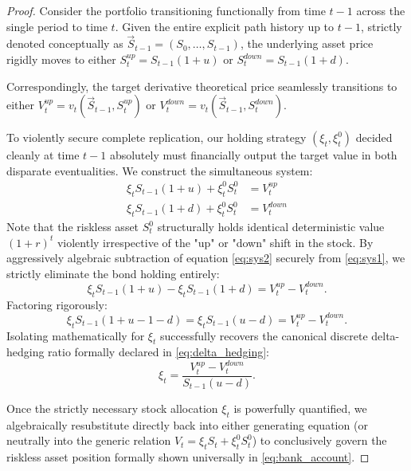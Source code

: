 \begin{proof}
    Consider the portfolio transitioning functionally from time $t-1$ across the single period to time $t$. Given the entire explicit path history up to $t-1$, strictly denoted conceptually as $\vec{S}_{t-1} = (S_0, \dots, S_{t-1})$, the underlying asset price rigidly moves to either $S_t^{up} = S_{t-1}(1+u)$ or $S_t^{down} = S_{t-1}(1+d)$. 
    
    Correspondingly, the target derivative theoretical price seamlessly transitions to either $V_t^{up} = v_t(\vec{S}_{t-1}, S_t^{up})$ or $V_t^{down} = v_t(\vec{S}_{t-1}, S_t^{down})$.
    
    To violently secure complete replication, our holding strategy $(\xi_t, \xi_t^0)$ decided cleanly at time $t-1$ absolutely must financially output the target value in both disparate eventualities. We construct the simultaneous system:
    \begin{align}
        \xi_t S_{t-1}(1+u) + \xi_t^0 S_t^0 &= V_t^{up} \label{eq:sys1} \\
        \xi_t S_{t-1}(1+d) + \xi_t^0 S_t^0 &= V_t^{down} \label{eq:sys2}
    \end{align}
    Note that the riskless asset $S_t^0$ structurally holds identical deterministic value $(1+r)^t$ violently irrespective of the "up" or "down" shift in the stock. By aggressively algebraic subtraction of equation \eqref{eq:sys2} securely from \eqref{eq:sys1}, we strictly eliminate the bond holding entirely:
    \begin{equation}
        \xi_t S_{t-1}(1+u) - \xi_t S_{t-1}(1+d) = V_t^{up} - V_t^{down}.
    \end{equation}
    Factoring rigorously:
    \begin{equation}
        \xi_t S_{t-1} (1 + u - 1 - d) = \xi_t S_{t-1}(u-d) = V_t^{up} - V_t^{down}.
    \end{equation}
    Isolating mathematically for $\xi_t$ successfully recovers the canonical discrete delta-hedging ratio formally declared in \eqref{eq:delta_hedging}:
    \begin{equation}
        \xi_t = \frac{V_t^{up} - V_t^{down}}{S_{t-1}(u-d)}.
    \end{equation}
    
    Once the strictly necessary stock allocation $\xi_t$ is powerfully quantified, we algebraically resubstitute directly back into either generating equation (or neutrally into the generic relation $V_t = \xi_t S_t + \xi_t^0 S_t^0$) to conclusively govern the riskless asset position formally shown universally in \eqref{eq:bank_account}.
\end{proof}

